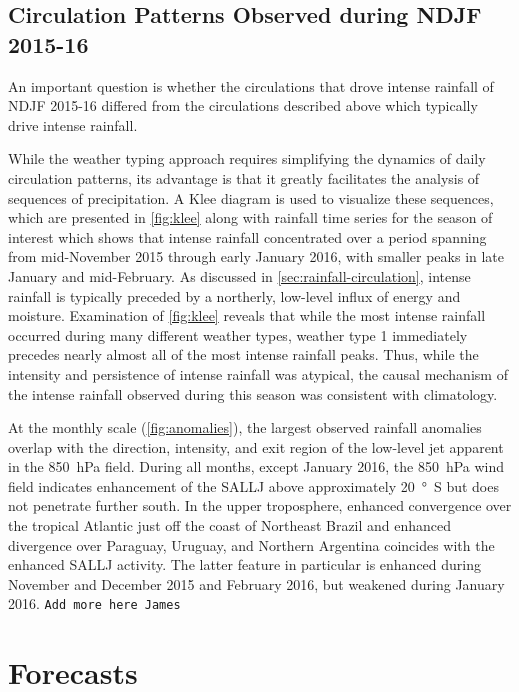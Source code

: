 \documentclass[twocol]{ametsoc}
\begin{document}
\subsection{Circulation Patterns Observed during NDJF 2015-16}

An important question is whether the circulations that drove intense rainfall of NDJF 2015-16 differed from the circulations described above which typically drive intense rainfall.

While the weather typing approach requires simplifying the dynamics of daily circulation patterns, its advantage is that it greatly facilitates the analysis of sequences of precipitation.
A Klee diagram \citep{Munoz2015, Munoz2016} is used to visualize these sequences, which are presented in \cref{fig:klee} along with rainfall time series for the season of interest which shows that intense rainfall concentrated over a period spanning from mid-November 2015 through early January 2016, with smaller peaks in late January and mid-February.
As discussed in \cref{sec:rainfall-circulation}, intense rainfall is typically preceded by a northerly, low-level influx of energy and moisture.
Examination of \cref{fig:klee} reveals that while the most intense rainfall occurred during many different weather types, weather type 1 immediately precedes nearly almost all of the most intense rainfall peaks.
Thus, while the intensity and persistence of intense rainfall was atypical, the causal mechanism of the intense rainfall observed during this season was consistent with climatology.

At the monthly scale (\cref{fig:anomalies}), the largest observed rainfall anomalies overlap with the direction, intensity, and exit region of the low-level jet apparent in the \SI{850}{\hecto\pascal} field.
During all months, except January 2016, the \SI{850}{\hecto\pascal} wind field indicates enhancement of the SALLJ above approximately \SI{20}{\degree S} but does not penetrate further south.
In the upper troposphere, enhanced convergence over the tropical Atlantic just off the coast of Northeast Brazil and enhanced divergence over Paraguay, Uruguay, and Northern Argentina coincides with the enhanced SALLJ activity.
The latter feature in particular is enhanced during November and December 2015 and February 2016, but weakened during January 2016.
\texttt{Add more here James}

\section{Forecasts} \label{sec:fcsts}
\end{document}
